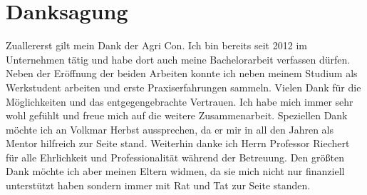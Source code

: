 
\chapter*{Danksagung}
\label{sec:Danksagung}
Zuallererst gilt mein Dank der Agri Con.
Ich bin bereits seit 2012 im Unternehmen tätig und habe dort auch meine Bachelorarbeit verfassen dürfen.
Neben der Eröffnung der beiden Arbeiten konnte ich neben meinem Studium als Werkstudent arbeiten und erste Praxiserfahrungen sammeln.
Vielen Dank für die Möglichkeiten und das entgegengebrachte Vertrauen.
Ich habe mich immer sehr wohl gefühlt und freue mich auf die weitere Zusammenarbeit.
Speziellen Dank möchte ich an Volkmar Herbst aussprechen, da er mir in all den Jahren als Mentor hilfreich zur Seite stand.
Weiterhin danke ich Herrn Professor Riechert für alle Ehrlichkeit und Professionalität während der Betreuung.
Den größten Dank möchte ich aber meinen Eltern widmen, da sie mich nicht nur finanziell unterstützt haben sondern immer mit Rat und Tat zur Seite standen.